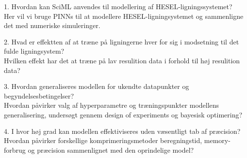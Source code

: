 1. Hvordan kan SciML anvendes til modellering af HESEL-ligningssystemet?\\ \ignorespaces
Her vil vi bruge PINNs til at modellere HESEL-ligningsystemet og sammenligne det med numeriske simuleringer.

2. Hvad er effektten af at træne på ligningerne hver for sig i modsetning til det fulde ligningsystem? \\ \ignorespaces
Hvilken effekt har det at træne på lav resulition data i forhold til høj resulition data? 

3. Hvordan generaliseres modellen for ukendte datapunkter og begyndelsesbetingelser?\\ \ignorespaces
Hvordan påvirker valg af hyperparametre og træningspunkter modellens generalisering, undersøgt gennem design of experiments og bayesisk optimering?

4. I hvor høj grad kan modellen effektiviseres uden væsentligt tab af præcision?\\ \ignorespaces
Hvordan påvirker forskellige komprimeringsmetoder beregningstid, memory-forbrug og præcision sammenlignet med den oprindelige model?